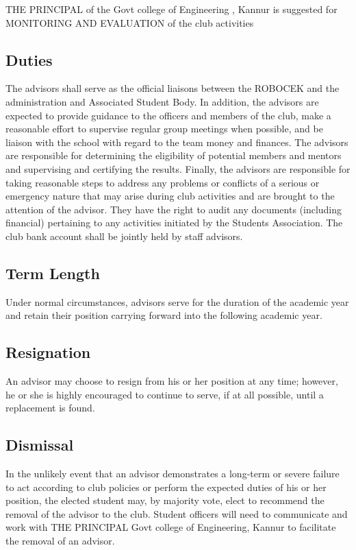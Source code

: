 THE PRINCIPAL of the Govt college of Engineering , Kannur is suggested for MONITORING AND EVALUATION of the club activities

\subsection{Duties}
The advisors shall serve as the official liaisons between the ROBOCEK and the administration and Associated Student Body. In addition, the advisors are expected to provide guidance to the officers and members of the club, make a reasonable effort to supervise regular group meetings when possible, and be liaison with the school with regard to the team money and finances. The advisors are responsible for determining the eligibility of potential members and mentors and supervising and certifying the results. Finally, the advisors are responsible for taking reasonable steps to address any problems or conflicts of a serious or emergency nature that may arise during club activities and are brought to the attention of the advisor. They have the right to audit any documents (including financial) pertaining to any activities initiated by the Students Association. The club bank account shall be jointly held by staff advisors.

\subsection{Term Length}
Under normal circumstances, advisors serve for the duration of the academic year and retain their position carrying forward into the following  academic year.

\subsection{Resignation}
An advisor may choose to resign from his or her position at any time; however, he or she is highly encouraged to continue to serve, if at all possible, until a replacement is found.

\subsection{Dismissal}
In the unlikely event that an advisor demonstrates a long-term or severe failure to act according to club policies or perform the expected duties of his or her position, the elected student may, by majority vote, elect to recommend the removal of the advisor to the club. Student officers will need to communicate and work with THE PRINCIPAL Govt college of Engineering, Kannur to facilitate the removal of an advisor.

